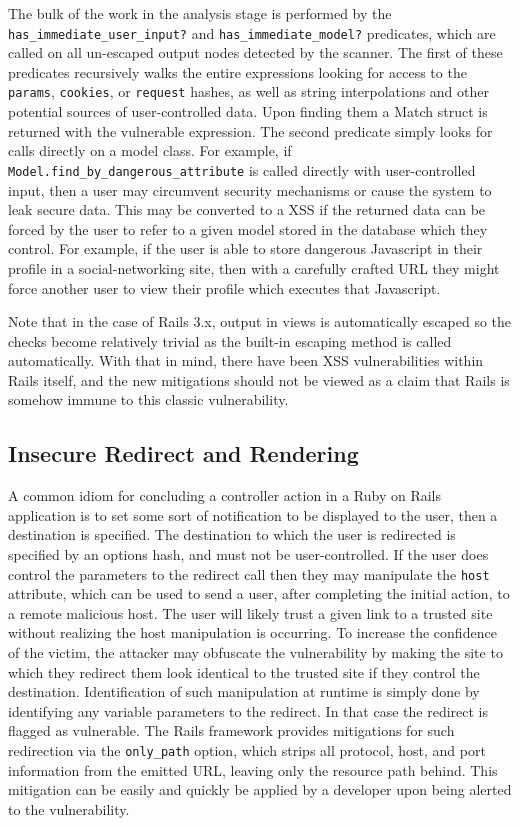 \documentclass[conference]{IEEEtran}
\begin{document}
The bulk of the work in the analysis stage is performed by the
\texttt{has\_immediate\_user\_input?} and \texttt{has\_immediate\_model?}
predicates, which are called on all un-escaped output nodes detected by the
scanner.  The first of these predicates recursively walks the entire expressions
looking for access to the \texttt{params}, \texttt{cookies}, or \texttt{request}
hashes, as well as string interpolations and other potential sources of
user-controlled data.  Upon finding them a Match struct is returned with the
vulnerable expression.  The second predicate simply looks for calls directly on
a model class.  For example, if \texttt{Model.find\_by\_dangerous\_attribute} is
called directly with user-controlled input,  then a user may circumvent security
mechanisms or cause the system to leak secure data.  This may be converted to a
XSS if the returned data can be forced by the user to refer to a given model
stored in the database which they control.  For example, if the user is able to
store dangerous Javascript in their profile in a social-networking site, then
with a carefully crafted URL they might force another user to view their profile
which executes that Javascript.

Note that in the case of Rails 3.x, output in views is automatically escaped so
the checks become relatively trivial as the built-in escaping method is called
automatically.  With that in mind, there have been XSS vulnerabilities within
Rails itself, and the new mitigations should not be viewed as a claim that Rails
is somehow immune to this classic vulnerability.

\subsection{Insecure Redirect and Rendering}

A common idiom for concluding a controller action in a Ruby on Rails application
is to set some sort of notification to be displayed to the user, then a
destination is specified.  The destination to which the user is redirected is
specified by an options hash, and must not be user-controlled.  If the user does control the
parameters to the redirect call then they may manipulate the \texttt{host} attribute,
which can be used to send a user, after completing the initial action, to a remote
malicious host\cite{OWASP_redirect}.  The user will likely trust a given link to a trusted
site without realizing the host manipulation is occurring. To increase the confidence of
the victim, the attacker may obfuscate the vulnerability by making the site to which they
redirect them look identical to the trusted site if they control the destination.
Identification of such manipulation at runtime is simply done by identifying any variable
parameters to the redirect.  In that case the redirect is flagged as vulnerable.  The
Rails framework provides mitigations for such redirection via the \texttt{only\_path}
option, which strips all protocol, host, and port information from the emitted
URL, leaving only the resource path behind. This mitigation can be easily and
quickly be applied by a developer upon being alerted to the vulnerability.
\end{document}

